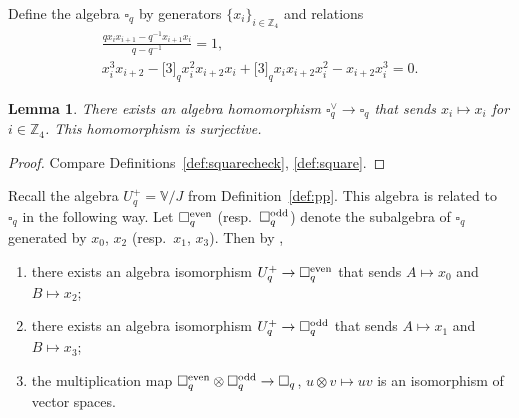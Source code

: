 \documentclass[pdftex]{sigma}
\numberwithin{equation}{section}
\newtheorem{Lemma}[Theorem]{Lemma}
\begin{document}
\begin{Definition}\label{def:square} Define the algebra $\square_q$ by generators $\lbrace x_i \rbrace_{i \in \mathbb Z_4}$ and relations
\begin{gather*}
\frac{q x_i x_{i+1}-q^{-1}x_{i+1}x_i}{q-q^{-1}} = 1,\\ %
x^3_i x_{i+2} - \lbrack 3 \rbrack_q x^2_i x_{i+2} x_i +\lbrack 3 \rbrack_q x_i x_{i+2} x^2_i -x_{i+2} x^3_i = 0.%
\end{gather*}
\end{Definition}

\begin{Lemma}\label{lem:add}There exists an algebra homomorphism $\square^\vee_q \to \square_q$ that sends
$x_i \mapsto x_i$ for $i \in {\mathbb Z}_4$. This homomorphism is surjective.
\end{Lemma}
\begin{proof} Compare Definitions~\ref{def:squarecheck}, \ref{def:square}.
\end{proof}

Recall the algebra $U^+_q=\mathbb V/J$ from Definition~\ref{def:pp}. This algebra is related to~$\square_q$ in the following way. Let $ \square^{\rm even}_q$ (resp.\ $ \square^{\rm odd}_q$) denote the subalgebra
of $ \square_q$ generated by $x_0$, $x_2$ (resp.\ $x_1$, $x_3$). Then by \cite[Proposition~5.5]{pospart},
 \begin{enumerate}\itemsep=0pt
\item[\rm (i)] there exists an algebra isomorphism $U^+_q \to \square^{\rm even}_q$ that sends
 $A\mapsto x_0$ and $B\mapsto x_2$;
\item[\rm (ii)] there exists an algebra isomorphism $U^+_q \to \square^{\rm odd}_q$ that sends $A\mapsto x_1$ and $B\mapsto x_3$;
\item[\rm (iii)] the multiplication map $\square^{\rm even}_q \otimes \square^{\rm odd}_q \to \square_q$,
 $u \otimes v \mapsto uv$ is an isomorphism of vector spaces.
\end{enumerate}
\end{document}
